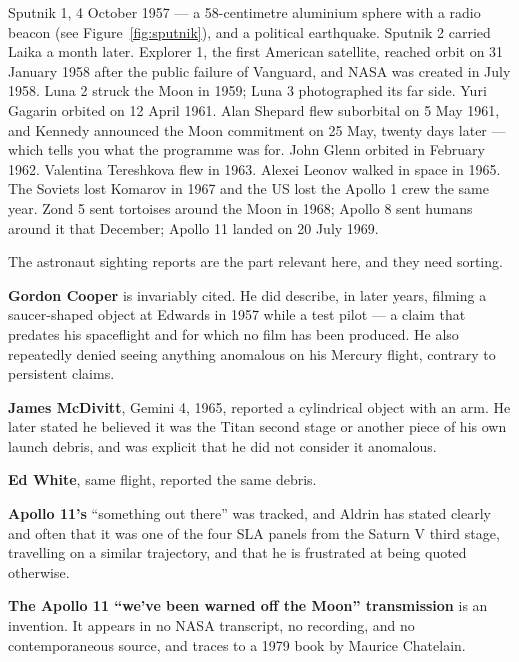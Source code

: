 Sputnik 1, 4 October 1957 --- a 58-centimetre aluminium sphere with a radio beacon (see Figure~\ref{fig:sputnik}), and a political
earthquake. Sputnik 2 carried Laika a month later. Explorer 1, the first American satellite,
reached orbit on 31 January 1958 after the public failure of Vanguard, and NASA was created in
July 1958. Luna 2 struck the Moon in 1959; Luna 3 photographed its far side. Yuri Gagarin orbited
on 12 April 1961. Alan Shepard flew suborbital on 5 May 1961, and Kennedy announced the Moon
commitment on 25 May, twenty days later --- which tells you what the programme was for. John Glenn
orbited in February 1962. Valentina Tereshkova flew in 1963. Alexei Leonov walked in space in 1965.
The Soviets lost Komarov in 1967 and the US lost the Apollo 1 crew the same year. Zond 5 sent
tortoises around the Moon in 1968; Apollo 8 sent humans around it that December; Apollo 11 landed
on 20 July 1969.

The astronaut sighting reports are the part relevant here, and they need sorting.

\textbf{Gordon Cooper} is invariably cited. He did describe, in later years, filming a
saucer-shaped object at Edwards in 1957 while a test pilot --- a claim that predates his spaceflight
and for which no film has been produced. He also repeatedly denied seeing anything anomalous on
his Mercury flight, contrary to persistent claims.

\textbf{James McDivitt}, Gemini 4, 1965, reported a cylindrical object with an arm. He later stated
he believed it was the Titan second stage or another piece of his own launch debris, and was
explicit that he did not consider it anomalous. 

\textbf{Ed White}, same flight, reported the same debris.

\textbf{Apollo 11's} ``something out there'' was tracked, and Aldrin has stated clearly and often
that it was one of the four SLA panels from the Saturn V third stage, travelling on a similar
trajectory, and that he is frustrated at being quoted otherwise.

\textbf{The Apollo 11 ``we've been warned off the Moon'' transmission} is an invention. It appears
in no NASA transcript, no recording, and no contemporaneous source, and traces to a 1979 book by
Maurice Chatelain.

